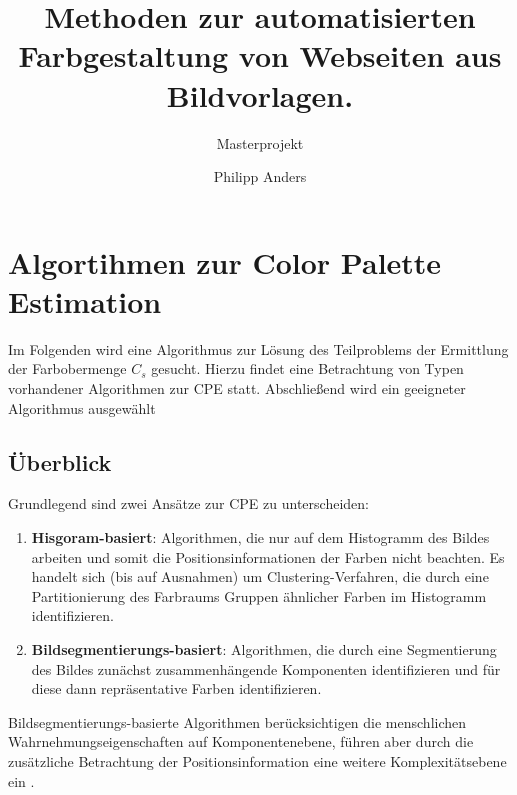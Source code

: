 \documentclass[11pt, bibliography=totoc]{scrartcl}
\begin{document}
\title{Methoden zur automatisierten Farbgestaltung von Webseiten aus Bildvorlagen.}
\subtitle{Masterprojekt}
\author{Philipp Anders}

\maketitle

\begin{abstract}
\end{abstract}

\pagebreak
\tableofcontents
\pagebreak













\section{Algortihmen zur Color Palette Estimation}

Im Folgenden wird eine Algorithmus zur Lösung des Teilproblems der Ermittlung der Farbobermenge $C_s$ gesucht. Hierzu findet eine Betrachtung von Typen vorhandener Algorithmen zur CPE statt. Abschließend wird ein geeigneter Algorithmus ausgewählt

\subsection{Überblick}

Grundlegend sind zwei Ansätze zur CPE zu unterscheiden:
\begin{enumerate}
    \item \textbf{Hisgoram-basiert}: Algorithmen, die nur auf dem Histogramm des Bildes arbeiten und somit die Positionsinformationen der Farben nicht beachten. Es handelt sich (bis auf Ausnahmen) um Clustering-Verfahren, die durch eine Partitionierung des Farbraums Gruppen ähnlicher Farben im Histogramm identifizieren.
    \item \textbf{Bildsegmentierungs-basiert}: Algorithmen, die durch eine Segmentierung des Bildes zunächst zusammenhängende Komponenten identifizieren und für diese dann repräsentative Farben identifizieren.
\end{enumerate}


Bildsegmentierungs-basierte Algorithmen berücksichtigen die menschlichen Wahrnehmungseigenschaften auf Komponentenebene, führen aber durch die zusätzliche Betrachtung der Positionsinformation eine weitere Komplexitätsebene ein \citep{colorthemes}.
\end{document}
